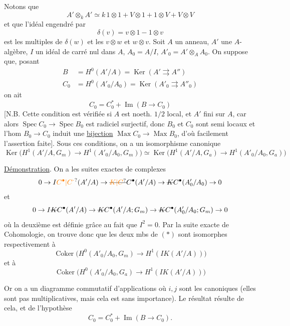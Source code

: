  Notons que
\[
A'\otimes_k A'\simeq k\,1\otimes1+V\otimes1+1\otimes V+V\otimes V
\]
et que l'idéal engendré par
\[
\delta(v)=v\otimes1-1\otimes v
\]
est  
les multiples de $\delta(w)$ et les
$v\otimes w$ et $w\otimes v$.
  Soit $A$ un anneau, $A'$ une $A$-algèbre, $I$ un
idéal  de carré nul dans $A$, $A_0=A/I$, $A'_0=A'\otimes_A A_0$.
On suppose que, 
posant
\[
\begin{aligned}
B&=H^0(A'/A)=\operatorname{Ker}(A'\rightrightarrows A'')\\
C_0&=H^0(A'_0/A_0)=\operatorname{Ker}(A'_0\rightrightarrows A''_0)
\end{aligned}
\]
on ait
\[
C_0=C_0^*+\operatorname{Im}(B\to C_0)
\]
[N.B. Cette condition est vérifiée si $A$ est noeth. $1/2$ local,
et $A'$ fini sur $A$, car alors $\operatorname{Spec} C_0\to\operatorname{Spec} B_0$ est
radiciel surjectif, donc $B_0$ et $C_0$ sont semi locaux et
l'hom $B_0\to C_0$ induit une \uline{bijection} $\operatorname{Max} C_0\to\operatorname{Max} B_0$,
d'où facilement l'assertion faite]. Sous ces
conditions, on a un isomorphisme canonique
\[
\operatorname{Ker}\big(H^1(A'/A,G_m)\to H^1(A'_0/A_0,G_m)\big)\simeq
\operatorname{Ker}\big(H^1(A'/A,G_a)\to H^1(A'_0/A_0,G_a)\big) \tag*{$(*)$}
\]

\uline{Démonstration}. On a les suites exactes de complexes
\[
0\to I\unsure{C^{\bullet}|C^{\cdot}}(A'/A)\to \deleted{\unsure{K|C}}C^{\bullet}(A'/A)\to \deleted{K}C^{\bullet}(A'_0/A_0)\to0
\]
et
\[
0\to I\deleted{K}C^{\bullet}(A'/A)\to \deleted{K}C^{\bullet}(A'/A;G_m)\to \deleted{K}C^{\bullet}(A'_0/A_0;G_m)\to0
\]
où la deuxième est définie grâce au fait que
$I^2=0$. Par la suite exacte de Cohomologie,
on trouve donc que les deux mbs de $(*)$
sont isomorphes respectivement à
\[
\operatorname{Coker}\big(H^0(A'_0/A_0,G_m)\to H^1(IK(A'/A))\big)
\]
et à
\[
\operatorname{Coker}\big(H^0(A'_0/A_0,G_a)\to H^1(IK(A'/A))\big)
\]

Or on a un diagramme commutatif d'applications
où $i,j$ sont les  canoniques (elles
sont pas multiplicatives, mais cela est sans importance).
Le résultat résulte de cela, et de l'hypothèse
\[
C_0=C_0^*+\operatorname{Im}(B\to C_0).
\]

